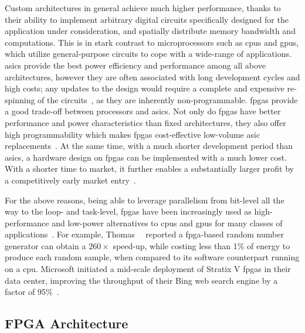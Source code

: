 Custom architectures in general achieve much higher performance, thanks to
their ability to implement arbitrary digital circuits specifically designed
for the application under consideration, and spatially distribute memory
bandwidth and computations.  This is in stark contrast to microprocessors
such as \glspl{cpu} and \glspl{gpu}, which utilize general-purpose circuits
to cope with a wide-range of applications. \glspl{asic} provide the best
power efficiency and performance among all above architectures, however
they are often associated with long development cycles and high costs; any
updates to the design would require a complete and expensive re-spinning
of the circuits~\cite{bacon13}, as they are inherently non-programmable.
\Glspl{fpga} provide a good trade-off between processors and \glspl{asic}.
Not only do \glspl{fpga} have better performance and power characteristics
than fixed architectures, they also offer high programmability which makes
\glspl{fpga} cost-effective low-volume \gls{asic} replacements~\cite{karen04,
bacon13}.  At the same time, with a much shorter development period than
\glspl{asic}, a hardware design on \glspl{fpga} can be implemented with a much
lower cost.  With a shorter time to market, it further enables a substantially
larger profit by a competitively early market entry~\cite{semico12}.

For the above reasons, being able to leverage parallelism from bit-level all
the way to the loop- and task-level, \glspl{fpga} have been increasingly used
as high-performance and low-power alternatives to \glspl{cpu} and \glspl{gpu}
for many classes of applications~\cite{bacon13, brodtkorb10, sirowy08}.  For
example, Thomas~\etal~\cite{thomas09} reported a \gls{fpga}-based random number
generator can obtain a $260\times$ speed-up, while costing less than 1\% of
energy to produce each random sample, when compared to its software counterpart
running on a \gls{cpu}\@.  Microsoft initiated a mid-scale deployment of
Stratix V \glspl{fpga} in their data center, improving the throughput of their
Bing web search engine by a factor of 95\%~\cite{catapult}.


\subsection{FPGA Architecture}
\label{bg:sub:fpga_architecture}

